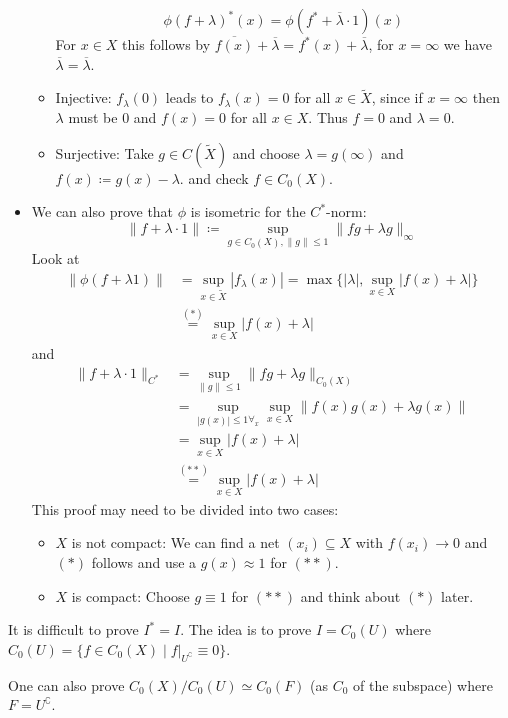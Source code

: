 \documentclass[a4paper]{article}
\begin{document}
\begin{exercise}[2.6]
\begin{itemize}
\begin{itemize}
			\begin{equation*}
				\phi(f + \lambda)^*(x) = \phi(f^* + \overline{\lambda} \cdot 1)(x)
			\end{equation*}
			For $x \in X$ this follows by $\overline{f(x)} + \overline{\lambda} =  f^*(x) + \overline{\lambda}$, for $x = \infty$ we have $\overline{\lambda} = \overline{\lambda}$. 
			\item Injective: $f_\lambda(0)$ leads to $f_\lambda(x) = 0$ for all $x \in \tilde X$, since if $x = \infty$ then $\lambda$ must be $0$ and $f(x) = 0$ for all $x \in X$. Thus $f = 0$ and $\lambda = 0$.
			\item Surjective: Take $g \in C(\tilde X)$  and choose $\lambda = g(\infty)$ and $f(x) \coloneq g(x) - \lambda$. and check $f \in C_0(X)$.
		\end{itemize}
		\item We can also prove that $\phi$ is isometric for the $C^*$-norm:
		\begin{equation*}
			\|f + \lambda \cdot 1\| \coloneq \sup_{g \in C_0(X), \|g\| \leq 1} \|fg + \lambda g \|_\infty
		\end{equation*}
		Look at
		\begin{align*}
			\| \phi(f + \lambda 1)\| &= \sup_{x \in \tilde{X}} | f_\lambda(x)| = \max \{ |\lambda|, \sup_{x \in X} |f(x) + \lambda| \}\\
			&\overset{(*)}{=} \sup_{x \in X} |f(x) + \lambda|
		\end{align*}
		and 
		\begin{align*}
			\| f + \lambda \cdot 1\|_{C^*} &= \sup_{\|g\| \leq 1} \|fg + \lambda g\|_{C_0(X)}\\
			&= \sup_{|g(x)| \leq 1 \forall_x} \sup_{x \in X} \| f(x) g(x) + \lambda g(x) \|\\
			&= \sup_{x \in X} |f(x) + \lambda|\\
			&\overset{(**)}{=} \sup_{x \in X} |f(x) + \lambda|
		\end{align*}
		This proof may need to be divided into two cases:
		\begin{itemize}
			\item $X$ is not compact: We can find a net $(x_i) \subseteq X$ with $f(x_i) \to 0$ and $(*)$ follows and use a $g(x) \approx 1$ for $(**)$.
			\item $X$ is compact: Choose $g \equiv 1$ for $(**)$ and think about $(*)$ later.
		\end{itemize}
	\end{itemize}
\end{exercise}

\begin{exercise}[1.8]
	It is difficult to prove $I^* = I$. The idea is to prove $I = C_0(U)$ where $C_0(U) = \{ f \in C_0(X) \mid f|_{U^\complement} \equiv 0 \}$. 

	One can also prove $C_0(X)/C_0(U) \simeq C_0(F)$ (as $C_0$ of the subspace) where $F = U^\complement$.
\end{exercise}
\end{document}
